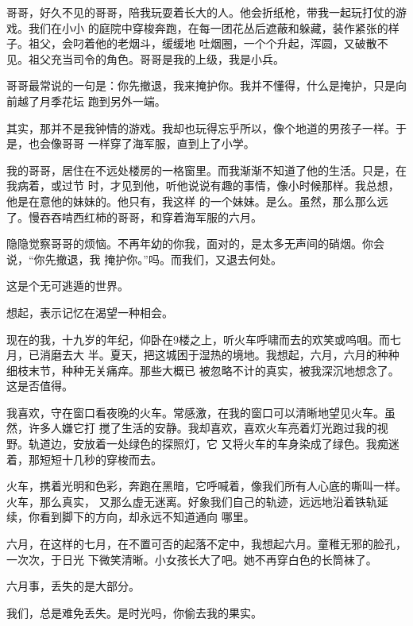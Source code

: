		哥哥，好久不见的哥哥，陪我玩耍着长大的人。他会折纸枪，带我一起玩打仗的游戏。我们在小小
	的庭院中穿梭奔跑，在每一团花丛后遮蔽和躲藏，装作紧张的样子。祖父，会叼着他的老烟斗，缓缓地
	吐烟圈，一个个升起，浑圆，又破散不见。祖父充当司令的角色。哥哥是我的上级，我是小兵。

		哥哥最常说的一句是：你先撤退，我来掩护你。我并不懂得，什么是掩护，只是向前越了月季花坛
	跑到另外一端。

		其实，那并不是我钟情的游戏。我却也玩得忘乎所以，像个地道的男孩子一样。于是，也会像哥哥
	一样穿了海军服，直到上了小学。

		我的哥哥，居住在不远处楼房的一格窗里。而我渐渐不知道了他的生活。只是，在我病着，或过节
	时，才见到他，听他说说有趣的事情，像小时候那样。我总想，他是在意他的妹妹的。他只有，我这样
	的一个妹妹。是么。虽然，那么那么远了。慢吞吞啃西红柿的哥哥，和穿着海军服的六月。

		隐隐觉察哥哥的烦恼。不再年幼的你我，面对的，是太多无声间的硝烟。你会说，“你先撤退，我
	掩护你。”吗。而我们，又退去何处。

		\vspace{1em}

		这是个无可逃遁的世界。\par
		想起，表示记忆在渴望一种相会。

		现在的我，十九岁的年纪，仰卧在9楼之上，听火车呼啸而去的欢笑或呜咽。而七月，已消磨去大
	半。夏天，把这城困于湿热的境地。我想起，六月，六月的种种细枝末节，种种无关痛痒。那些大概已
	被忽略不计的真实，被我深沉地想念了。这是否值得。

		我喜欢，守在窗口看夜晚的火车。常感激，在我的窗口可以清晰地望见火车。虽然，许多人嫌它打
	搅了生活的安静。我却喜欢，喜欢火车亮着灯光跑过我的视野。轨道边，安放着一处绿色的探照灯，它
	又将火车的车身染成了绿色。我痴迷着，那短短十几秒的穿梭而去。

		火车，携着光明和色彩，奔跑在黑暗，它呼喊着，像我们所有人心底的嘶叫一样。火车，那么真实，
	又那么虚无迷离。好象我们自己的轨迹，远远地沿着铁轨延续，你看到脚下的方向，却永远不知道通向
	哪里。

		六月，在这样的七月，在不置可否的起落不定中，我想起六月。童稚无邪的脸孔，一次次，于日光
	下微笑清晰。小女孩长大了吧。她不再穿白色的长筒袜了。

		六月事，丢失的是大部分。\par
		我们，总是难免丢失。是时光吗，你偷去我的果实。

	\endwriting



